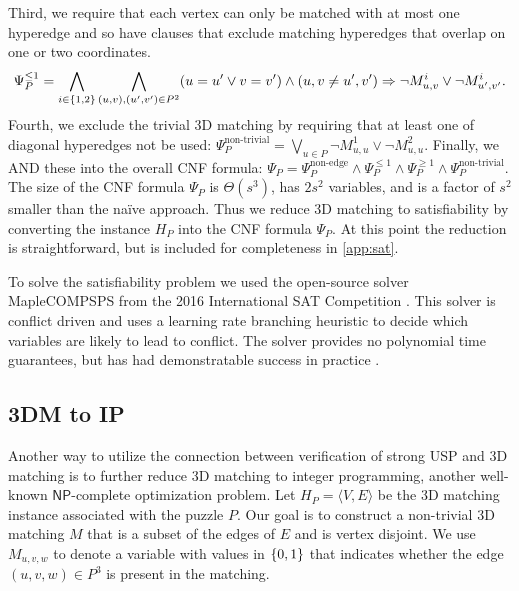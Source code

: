\documentclass[11pt]{article}
\renewcommand\NP{\ensuremath{\mathsf{NP}}}
\begin{document}
Third, we require that each vertex can only be matched with at most one hyperedge and so have clauses that exclude matching hyperedges that
overlap on one or two coordinates.
\begin{equation}
  \Psi_P^{\le 1} = \bigwedge_{i \in \left\{ 1,2 \right\}} \bigwedge_{(u,v),
    (u',v') \in P^2} (u = u' \vee v = v') \wedge (u,v \neq u',v')
  \Rightarrow \neg M_{u,v}^i \vee \neg M_{u',v'}^i.
\end{equation}
Fourth, we exclude the trivial 3D matching by requiring that at least
one of diagonal hyperedges not be used:
  $\Psi_P^{\text{non-trivial}} = \bigvee_{u \in P} \neg M_{u,u}^1 \vee
  \neg M_{u,u}^2.$
Finally, we AND these into the overall CNF formula:
  $\Psi_P = \Psi_P^{\text{non-edge}} \wedge \Psi_P^{\le 1} \wedge
  \Psi_P^{\ge 1} \wedge \Psi_P^{\text{non-trivial}}.$
The size of the CNF formula $\Psi_P$ is $\Theta(s^3)$, has $2s^2$
variables, and is a factor of $s^2$ smaller than the na\"{i}ve
approach.  Thus we reduce 3D matching to satisfiability by converting the
instance $H_P$ into the CNF formula $\Psi_P$.  At this point the
reduction is straightforward, but is included for completeness in
\autoref{app:sat}.

To solve the satisfiability problem %
we used the open-source solver MapleCOMPSPS from the 2016
International SAT Competition \cite{bhj17}.  This solver is
conflict driven and uses a learning rate branching heuristic to decide
which variables are likely to lead to conflict.  The solver provides
no polynomial time guarantees, but has had
demonstratable success in practice \cite{lgpc16}.

\subsection{3DM to IP}

Another way to utilize the connection between verification of strong
USP and 3D matching is to further reduce 3D matching to integer
programming, another well-known \NP{}-complete optimization problem.
Let $H_P = \langle V, E \rangle$ be the 3D matching instance
associated with the puzzle $P$.  Our goal is to construct a
non-trivial 3D matching $M$ that is a subset of the edges of $E$ and
is vertex disjoint.  We use $M_{u,v,w}$ to denote a variable with
values in $\left\{ 0,1 \right\}$ that indicates whether the edge $(u,v,w) \in
P^3$ is present in the matching.
\end{document}
